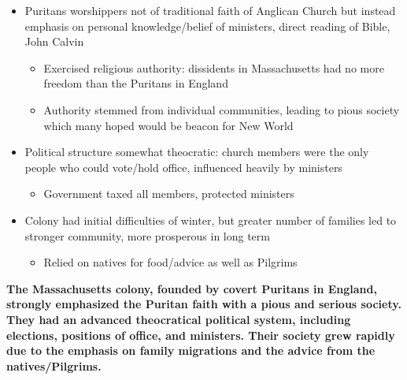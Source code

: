 \documentclass[a4paper]{article}
\begin{document}
{\begin{itemize}
\begin{itemize}
            \item Formed Congregational Church where each church has complete power
        \end{itemize}
        \item Puritans worshippers not of traditional faith of Anglican Church but instead emphasis on personal knowledge/belief of ministers, direct reading of Bible, John Calvin
        \begin{itemize}
            \item Exercised religious authority: dissidents in Massachusetts had no more freedom than the Puritans in England 
            \item Authority stemmed from individual communities, leading to pious society which many hoped would be beacon for New World
        \end{itemize}
        \item Political structure somewhat theocratic: church members were the only people who could vote/hold office, influenced heavily by ministers
        \begin{itemize}
            \item Government taxed all members, protected ministers
        \end{itemize}
        \item Colony had initial difficulties of winter, but greater number of families led to stronger community, more prosperous in long term
        \begin{itemize}
            \item Relied on natives for food/advice as well as Pilgrims
        \end{itemize}
    \end{itemize}
    \textbf{The Massachusetts colony, founded by covert Puritans in England, strongly emphasized the Puritan faith with a pious and serious society. They had an advanced theocratical political system, including elections, positions of office, and ministers. Their society grew rapidly due to the emphasis on family migrations and the advice from the natives/Pilgrims.}}
\end{document}
